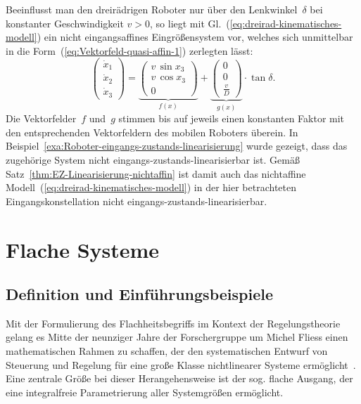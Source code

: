 \begin{example}
Beeinflusst man den dreirädrigen Roboter nur über den Lenkwinkel~$\delta$
bei konstanter Geschwindigkeit $v>0$, so liegt mit Gl.~(\ref{eq:dreirad-kinematisches-modell})
ein nicht eingangsaffines Eingrößensystem vor, welches sich unmittelbar
in die Form~(\ref{eq:Vektorfeld-quasi-affin-1}) zerlegten lässt:
\[
\left(\begin{array}{c}
\dot{x}_{1}\\
\dot{x}_{2}\\
\dot{x}_{3}
\end{array}\right)=\underbrace{\left(\begin{array}{c}
v\,\sin x_{3}\\
v\,\cos x_{3}\\
0
\end{array}\right)}_{{\displaystyle f(x)}}+\underbrace{\left(\begin{array}{c}
0\\
0\\
\frac{v}{D}
\end{array}\right)}_{{\displaystyle g(x)}}\cdot\tan\delta.
\]
Die Vektorfelder~$f$ und~$g$ stimmen bis auf jeweils einen konstanten
Faktor mit den entsprechenden Vektorfeldern des mobilen Roboters überein.
In Beispiel~\ref{exa:Roboter-eingangs-zustands-linearisierung} wurde
gezeigt, dass das zugehörige System nicht eingangs-zustands-linearisierbar
ist. Gemäß Satz~\ref{thm:EZ-Linearisierung-nichtaffin} ist damit
auch das nichtaffine Modell~(\ref{eq:dreirad-kinematisches-modell})
in der hier betrachteten Eingangskonstellation nicht eingangs-zustands-linearisierbar.
\end{example}

\section{Flache Systeme\label{sec:Flache-Systeme}}

\subsection{Definition und Einführungsbeispiele}

Mit der Formulierung des Flachheitsbegriffs im Kontext der Regelungstheorie
gelang es Mitte der neunziger Jahre der Forschergruppe um Michel Fliess
einen mathematischen Rahmen zu schaffen, der den systematischen Entwurf
von Steuerung und Regelung für eine große Klasse nichtlinearer Systeme
ermöglicht~\cite{FLMR95ijc}. Eine zentrale Größe bei dieser Herangehensweise
ist der sog. flache Ausgang, der eine integralfreie Parametrierung
aller Systemgrößen ermöglicht.

